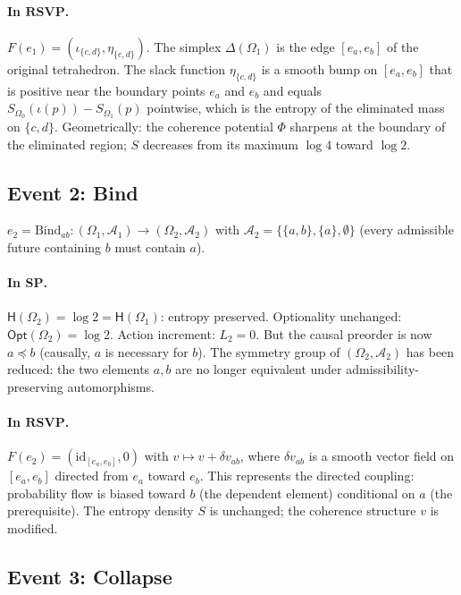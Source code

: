 \documentclass[12pt,a4paper]{article}
\theoremstyle{definition}
\theoremstyle{remark}
\newcommand{\Ent}{\mathsf{H}}
\newcommand{\Opt}{\mathsf{Opt}}
\newcommand{\SP}{\mathbf{SP}}
\newcommand{\RSVP}{\mathbf{RSVP}}
\newcommand{\id}{\mathrm{id}}
\newcommand{\Bind}{\mathrm{Bind}}
\newcommand{\PhiF}{\Phi}
\newcommand{\vF}{v}
\newcommand{\SF}{S}
\begin{document}
\paragraph{In $\RSVP$.}
$F(e_1)=(\iota_{\{c,d\}},\eta_{\{c,d\}})$. The simplex $\Delta(\Omega_1)$ is the edge
$[e_a,e_b]$ of the original tetrahedron. The slack function $\eta_{\{c,d\}}$ is a
smooth bump on $[e_a,e_b]$ that is positive near the boundary points $e_a$ and $e_b$
and equals $\SF_{\Omega_0}(\iota(p))-\SF_{\Omega_1}(p)$ pointwise, which is the
entropy of the eliminated mass on $\{c,d\}$. Geometrically: the coherence potential
$\PhiF$ sharpens at the boundary of the eliminated region; $\SF$ decreases from
its maximum $\log 4$ toward $\log 2$.

\subsection{Event 2: Bind}

$e_2=\Bind_{ab}:(\Omega_1,\mathcal{A}_1)\to(\Omega_2,\mathcal{A}_2)$
with $\mathcal{A}_2=\{\{a,b\},\{a\},\emptyset\}$ (every admissible future containing
$b$ must contain $a$).

\paragraph{In $\SP$.}
$\Ent(\Omega_2)=\log 2=\Ent(\Omega_1)$: entropy preserved. Optionality unchanged:
$\Opt(\Omega_2)=\log 2$. Action increment: $L_2=0$. But the causal preorder is
now $a\preceq b$ (causally, $a$ is necessary for $b$). The symmetry group of
$(\Omega_2,\mathcal{A}_2)$ has been reduced: the two elements $a,b$ are no longer
equivalent under admissibility-preserving automorphisms.

\paragraph{In $\RSVP$.}
$F(e_2)=(\id_{[e_a,e_b]},0)$ with $\vF\mapsto\vF+\delta\vF_{ab}$, where $\delta\vF_{ab}$
is a smooth vector field on $[e_a,e_b]$ directed from $e_a$ toward $e_b$. This
represents the directed coupling: probability flow is biased toward $b$ (the dependent
element) conditional on $a$ (the prerequisite). The entropy density $\SF$ is unchanged;
the coherence structure $\vF$ is modified.

\subsection{Event 3: Collapse}
\end{document}
